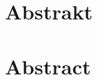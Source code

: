 \documentclass[12pt, a4paper]{article}
\begin{document}
\section*{Abstrakt}

\vfill
\section*{Abstract}

\end{document}
